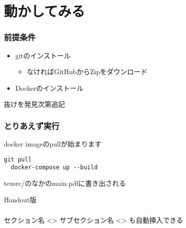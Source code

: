 \section{動かしてみる}

\begin{frame}{}
  \frametitle{前提条件}
  \begin{itemize}
    \item gitのインストール
      \begin{itemize}
        \item  なければGitHubからZipをダウンロード
      \end{itemize}
    \item Dockerのインストール
  \end{itemize}
  抜けを発見次第追記
\end{frame}


\begin{frame}[fragile]
  \frametitle{とりあえず実行}
  docker imageのpullが始まります
  \begin{lstlisting}[]
  git pull
  docker-compose up --build
  \end{lstlisting}

  texsrc/のなかのmain.pdfに書き出される

\end{frame}

\begin{frame}{Handout版}
  \frametitle{\insertsubsection}
  セクション名
  <\insertsection>
  サブセクション名
  <\insertsubsection>
  も自動挿入できる
\end{frame}
